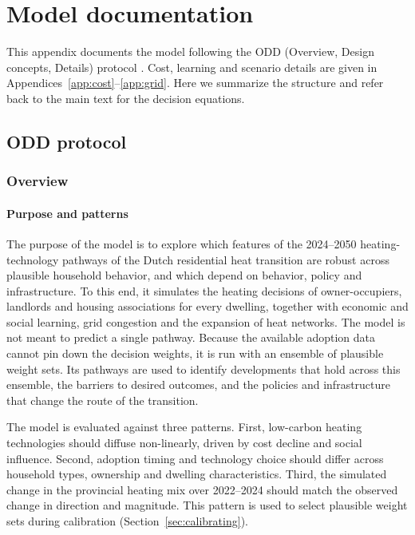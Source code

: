 \documentclass[preprint,12pt,authoryear]{elsarticle}
\begin{document}
\clearpage
\appendix



\section{Model documentation}
\label{app:model}

This appendix documents the model following the ODD (Overview, Design
concepts, Details) protocol \citep{grimmODDProtocolReview2010}. Cost,
learning and scenario details are given in
Appendices~\ref{app:cost}--\ref{app:grid}. Here we summarize the structure
and refer back to the main text for the decision equations.

\subsection{ODD protocol}
\label{app:odd}



\subsubsection{Overview}

\paragraph{Purpose and patterns}
The purpose of the model is to explore which features of the 2024--2050
heating-technology pathways of the Dutch residential heat transition are
robust across plausible household behavior, and which depend on behavior,
policy and infrastructure. To this end, it simulates the heating decisions
of owner-occupiers, landlords and housing associations for every dwelling,
together with economic and social learning, grid congestion and the
expansion of heat networks. The model is not meant to predict a single
pathway. Because the available adoption data cannot pin down the decision
weights, it is run with an ensemble of plausible weight sets. Its pathways
are used to identify developments that hold across this ensemble, the
barriers to desired outcomes, and the policies and infrastructure that
change the route of the transition.

The model is evaluated against three patterns. First, low-carbon heating
technologies should diffuse non-linearly, driven by cost decline and social
influence. Second, adoption timing and technology choice should differ
across household types, ownership and dwelling characteristics. Third, the
simulated change in the provincial heating mix over 2022--2024 should match
the observed change in direction and magnitude. This pattern is used to
select plausible weight sets during calibration
(Section~\ref{sec:calibrating}).
\end{document}
